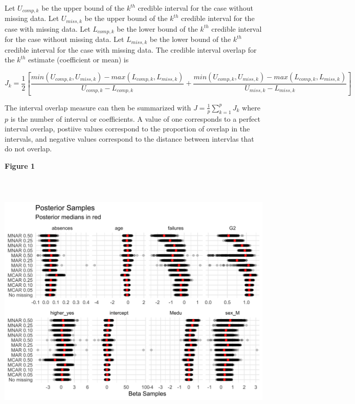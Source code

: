 \documentclass[11pt]{article}
\begin{document}
Let $U_{comp,k}$ be the upper bound of the $k^{th}$ credible interval for the case without missing data. Let $U_{miss,k}$ be the upper bound of the $k^{th}$ credible interval for the case with missing data. Let $L_{comp,k}$ be the lower bound of the $k^{th}$ credible interval for the case without missing data. Let $L_{miss,k}$ be the lower bound of the $k^{th}$ credible interval for the case with missing data. The credible interval overlap for the $k^{th}$ estimate (coefficient or mean) is 

$$J_k = \frac{1}{2}\left[\frac{min(U_{comp,k}, U_{miss,k}) - max(L_{comp,k}, L_{miss,k})}{U_{comp,k} - L_{comp,k}} + \frac{min(U_{comp,k}, U_{miss,k}) - max(L_{comp,k}, L_{miss,k})}{U_{miss,k} - L_{miss,k}}\right]$$

The interval overlap measure can then be summarized with $J = \frac{1}{p}\sum_{k = 1}^pJ_k$ where $p$ is the number of interval or coefficients. A value of one corresponds to a perfect interval overlap, postiive values correspond to the proportion of overlap in the intervals, and negative values correspond to the distance between intervlas that do not overlap. 

\vspace{0.25in}

\textbf{Figure 1}

\includegraphics[width=6.5in, height=5in]{posterior-samples-1}
\end{document}
